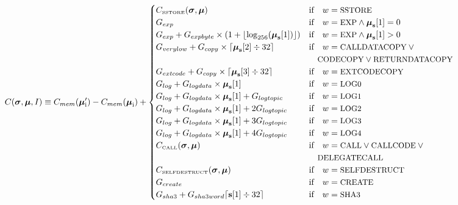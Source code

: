 \documentclass[9pt,oneside]{amsart}
\begin{document}
\begin{equation}
C(\boldsymbol{\sigma}, \boldsymbol{\mu}, I) \equiv C_{mem}(\boldsymbol{\mu}'_{\mathrm{i}})-C_{mem}(\boldsymbol{\mu}_{\mathrm{i}}) + \begin{cases}
C_\text{\tiny SSTORE}(\boldsymbol{\sigma}, \boldsymbol{\mu}) & \text{if} \quad w = \text{\small SSTORE} \\
G_{exp} & \text{if} \quad w = \text{\small EXP} \wedge \boldsymbol{\mu}_{\mathbf{s}}[1] = 0 \\
G_{exp} + G_{expbyte}\times(1+\lfloor\log_{256}(\boldsymbol{\mu}_{\mathbf{s}}[1])\rfloor) & \text{if} \quad w = \text{\small EXP} \wedge \boldsymbol{\mu}_{\mathbf{s}}[1] > 0 \\
G_{verylow} + G_{copy}\times\lceil\boldsymbol{\mu}_{\mathbf{s}}[2] \div 32\rceil & \text{if} \quad w = \text{\small CALLDATACOPY} \> \lor \\
&\quad\text{\small CODECOPY} \lor \text{\small RETURNDATACOPY} \\
G_{extcode} + G_{copy}\times\lceil\boldsymbol{\mu}_{\mathbf{s}}[3] \div 32\rceil & \text{if} \quad w = \text{\small EXTCODECOPY} \\
G_{log}+G_{logdata}\times\boldsymbol{\mu}_{\mathbf{s}}[1] & \text{if} \quad w = \text{\small LOG0} \\
G_{log}+G_{logdata}\times\boldsymbol{\mu}_{\mathbf{s}}[1]+G_{logtopic} & \text{if} \quad w = \text{\small LOG1} \\
G_{log}+G_{logdata}\times\boldsymbol{\mu}_{\mathbf{s}}[1]+2G_{logtopic} & \text{if} \quad w = \text{\small LOG2} \\
G_{log}+G_{logdata}\times\boldsymbol{\mu}_{\mathbf{s}}[1]+3G_{logtopic} & \text{if} \quad w = \text{\small LOG3} \\
G_{log}+G_{logdata}\times\boldsymbol{\mu}_{\mathbf{s}}[1]+4G_{logtopic} & \text{if} \quad w = \text{\small LOG4} \\
C_\text{\tiny CALL}(\boldsymbol{\sigma}, \boldsymbol{\mu}) & \text{if} \quad w = \text{\small CALL} \lor \text{\small CALLCODE} \> \lor \\
&\quad\text{\small DELEGATECALL} \\
C_\text{\tiny SELFDESTRUCT}(\boldsymbol{\sigma}, \boldsymbol{\mu}) & \text{if} \quad w = \text{\small SELFDESTRUCT} \\
G_{create} & \text{if} \quad w = \text{\small CREATE}\\
G_{sha3}+G_{sha3word} \lceil \mathbf{s}[1] \div 32 \rceil & \text{if} \quad w = \text{\small SHA3}\\

\end{cases}
\end{equation}
\end{document}
